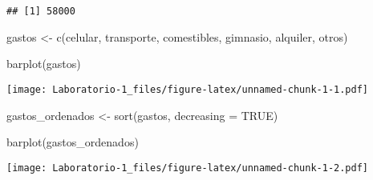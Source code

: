 \documentclass[
]{article}
\newenvironment{Shaded}{\begin{snugshade}}{\end{snugshade}}
\newcommand{\AttributeTok}[1]{\textcolor[rgb]{0.77,0.63,0.00}{#1}}
\newcommand{\ConstantTok}[1]{\textcolor[rgb]{0.00,0.00,0.00}{#1}}
\newcommand{\FunctionTok}[1]{\textcolor[rgb]{0.00,0.00,0.00}{#1}}
\newcommand{\NormalTok}[1]{#1}
\newcommand{\OtherTok}[1]{\textcolor[rgb]{0.56,0.35,0.01}{#1}}
\begin{document}
\begin{verbatim}
## [1] 58000
\end{verbatim}

\begin{Shaded}
\begin{Highlighting}[]
\NormalTok{gastos }\OtherTok{\textless{}{-}} \FunctionTok{c}\NormalTok{(celular, transporte, comestibles, gimnasio, alquiler, otros)}

\FunctionTok{barplot}\NormalTok{(gastos)}
\end{Highlighting}
\end{Shaded}

\texttt{[image: Laboratorio-1\_files/figure-latex/unnamed-chunk-1-1.pdf]}

\begin{Shaded}
\begin{Highlighting}[]
\NormalTok{gastos\_ordenados }\OtherTok{\textless{}{-}} \FunctionTok{sort}\NormalTok{(gastos, }\AttributeTok{decreasing =} \ConstantTok{TRUE}\NormalTok{)}

\FunctionTok{barplot}\NormalTok{(gastos\_ordenados)}
\end{Highlighting}
\end{Shaded}

\texttt{[image: Laboratorio-1\_files/figure-latex/unnamed-chunk-1-2.pdf]}
\end{document}
